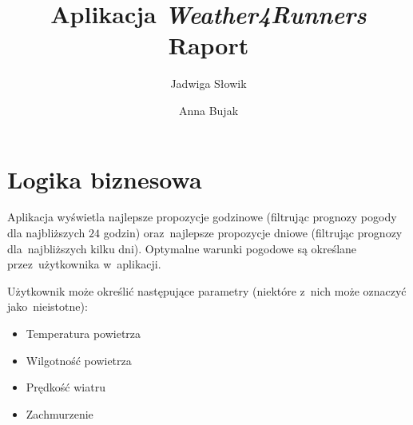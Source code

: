 \documentclass[11pt, a4paper, oneside]{scrartcl}
\author{Jadwiga Słowik \and Anna Bujak}
\title{Aplikacja \textit{Weather4Runners} \\ Raport}
\begin{document}
\maketitle

\section{Logika biznesowa}
Aplikacja wyświetla najlepsze propozycje godzinowe (filtrując prognozy pogody dla najbliższych $24$ godzin) oraz~najlepsze propozycje dniowe
(filtrując prognozy dla~najbliższych kilku dni). Optymalne warunki pogodowe są określane przez~użytkownika w~aplikacji.

Użytkownik może określić następujące parametry (niektóre z~nich może oznaczyć jako~nieistotne):
\begin{itemize}
	\item Temperatura powietrza
	\item Wilgotność powietrza
	\item Prędkość wiatru
	\item Zachmurzenie
\end{itemize} 
\end{document}
